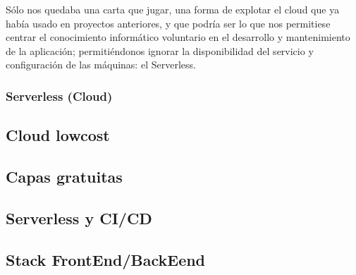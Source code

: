 \vspace{1em}
\par Sólo nos quedaba una carta que jugar, una forma de explotar el cloud que ya había usado en proyectos anteriores, y que podría ser lo que nos permitiese centrar el conocimiento informático voluntario en el desarrollo y mantenimiento de la aplicación; permitiéndonos ignorar la disponibilidad del servicio y configuración de las máquinas: el Serverless.
\clearpage
\subsubsection{Serverless (Cloud)}
\clearpage
\subsection{Cloud lowcost}
\clearpage
\subsection{Capas gratuitas}
\clearpage
\subsection{Serverless y CI/CD}
\clearpage
\subsection{Stack FrontEnd/BackEend}
\clearpage